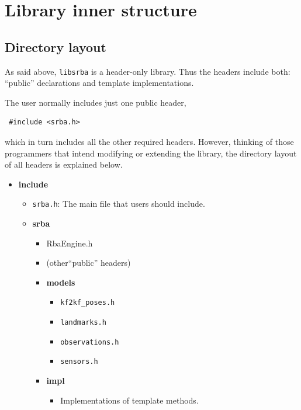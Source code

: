 \documentclass[a4paper,11pt]{article}
\begin{document}
\clearpage

\newpage
\section{Library inner structure}

\subsection{Directory layout}

As said above, \texttt{libsrba} is a header-only library. 
Thus the headers include both: ``public'' declarations and template implementations. 

The user normally includes just one public header,

\begin{lstlisting}
 #include <srba.h>
\end{lstlisting}

\noindent which in turn includes all the other required headers. 
However, thinking of those programmers that intend modifying or extending the library, 
the directory layout of all headers is explained below. 

\begin{itemize}[label=$\rhd$]
  \item{\textbf{include}
    \begin{itemize}[label=$\rhd$]
    \item{\texttt{srba.h}: The main file that users should include.}
    \item{\textbf{srba}
      \begin{itemize}[label=$\rhd$]
      \item{RbaEngine.h}
      \item{(other``public'' headers)}
      \item{\textbf{models}
	\begin{itemize}[label=$\rhd$]
	  \item \texttt{kf2kf\_poses.h}
	  \item \texttt{landmarks.h}
	  \item \texttt{observations.h}
	  \item \texttt{sensors.h}
	\end{itemize}
      }
      \item{\textbf{impl}
	\begin{itemize}[label=$\rhd$]
	\item Implementations of template methods.
	\end{itemize}
	}
      \end{itemize}
    }
    \end{itemize}
  }
\end{itemize}
\end{document}
